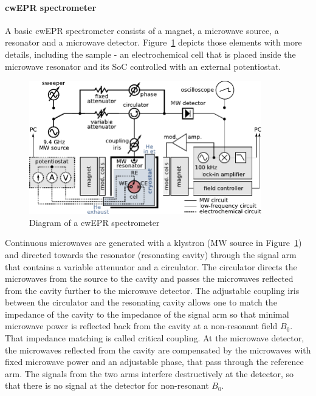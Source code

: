 \paragraph{cwEPR spectrometer}

A basic cwEPR spectrometer consists of a magnet, a microwave source, a resonator and a microwave detector. Figure~\ref{fig:cwerp_spectrometer} depicts those elements with more details, including the sample - an electrochemical cell that is placed inside the microwave resonator and its SoC controlled with an external potentiostat.

\begin{figure}[h]
\center
	\includegraphics[width=0.9\textwidth]{./operando_epr/figures/cwEPR_spectrometer_diagram.pdf}
	\caption{Diagram of a cwEPR spectrometer}
	\label{fig:cwerp_spectrometer}
\end{figure}

\par
Continuous microwaves are generated with a klystron (MW source in Figure~\ref{fig:cwerp_spectrometer}) and directed towards the resonator (resonating cavity) through the signal arm that contains a variable attenuator and a circulator. The circulator directs the microwaves from the source to the cavity and passes the microwaves reflected from the cavity further to the microwave detector. The adjustable coupling iris between the circulator and the resonating cavity allows one to match the impedance of the cavity to the impedance of the signal arm so that minimal microwave power is reflected back from the cavity at a non-resonant field $B_0$. That impedance matching is called critical coupling. At the microwave detector, the microwaves reflected from the cavity are compensated by the microwaves with fixed microwave power and an adjustable phase, that pass through the reference arm. The signals from the two arms interfere destructively at the detector, so that there is no signal at the detector for non-resonant $B_0$.

